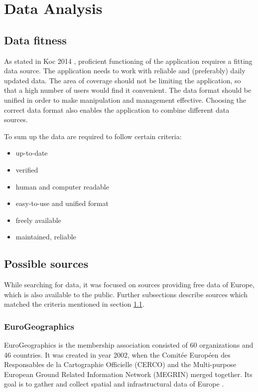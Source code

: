 \documentclass[thesis=M,english]{FITthesis}[2012/10/20]
\begin{document}
\chapter{Data Analysis}
\label{ch:DA}

\section{Data fitness}
\label{S1: Good data}
As stated in Koc 2014 \cite{Koc14}, proficient functioning of the application requires a fitting data source. The application needs to work with reliable and (preferably) daily updated data. The area of coverage should not be limiting the application, so that a high number of users would find it convenient. The data format should be unified in order to make manipulation and management effective. Choosing the correct data format also enables the application to combine different data sources.

To sum up the data are required to follow certain criteria:
\begin{itemize}
	\item up-to-date
	\item verified
	\item human and computer readable
	\item easy-to-use and unified format
	\item freely available
	\item maintained, reliable
\end{itemize}



\section{Possible sources}

While searching for data, it was focused on sources providing free data of Europe, which is also available to the public. Further subsections describe sources which matched the criteria mentioned in section \ref{S1: Good data}.

 
\subsection{EuroGeographics}
EuroGeographics is the membership association consisted of 60 organizations and 46 countries. It was created in year 2002, when the Comit{\' e}e Europ{\' e}en des Responsables de la Cartographie Officielle (CERCO) and the Multi-purpose European Ground Related Information Network (MEGRIN) merged together. Its goal is to gather and collect spatial and infrastructural data of Europe \cite{Euro16}. 
\end{document}
